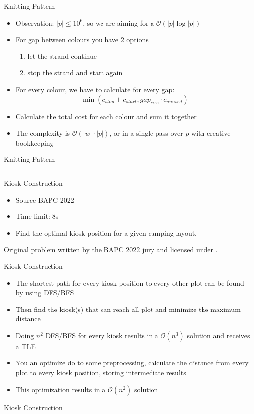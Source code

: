 \documentclass[11pt,pdf, aspectratio=169]{beamer}
\begin{document}
  \begin{frame}{Knitting Pattern}
    \begin{itemize}
      \item Observation: $|p| \leq 10^6$, so we are aiming for a $\mathcal{O}(|p|\log{}|p|)$
      \item For gap between colours you have 2 options
      \begin{enumerate}
        \item let the strand continue
        \item stop the strand and start again
      \end{enumerate}
      \item For every colour, we have to calculate for every gap: \[\min(c_{stop}+c_{start}, gap_{size}\cdot c_{unused})\]
      \item Calculate the total cost for each colour and sum it together
      \item The complexity is $\mathcal{O}(|w|\cdot |p|)$, or in a single pass over $p$ with creative bookkeeping
    \end{itemize}
  \end{frame}
  \begin{frame}[containsverbatim]{Knitting Pattern}
    \inputminted{python}{code/session-1/python/dapc-k.py}
  \end{frame}

  \begin{frame}{Kiosk Construction}
    \begin{itemize}
      \item Source BAPC 2022
      \item Time limit: 8s
      \item Find the optimal kiosk position for a given camping layout.
    \end{itemize}
    Original problem written by the BAPC 2022 jury and licensed under \doclicenseLongNameRef.

    \doclicenseImage
  \end{frame}
  \begin{frame}{Kiosk Construction}
    \begin{itemize}
      \item The shortest path for every kiosk position to every other plot can be found by using DFS/BFS
      \item Then find the kiosk(s) that can reach all plot and minimize the maximum distance
      \item Doing $n^2$ DFS/BFS for every kiosk results in a $\mathcal{O}(n^3)$ solution and receives a TLE
      \item You an optimize do to some preprocessing, calculate the distance from every plot to every kiosk position, storing intermediate results
      \item This optimization results in a $\mathcal{O}(n^2)$ solution
    \end{itemize}
  \end{frame}
  \begin{frame}[containsverbatim]{Kiosk Construction}
    \inputminted[fontsize=\tiny]{python}{code/session-1/python/bapc-k.py}
  \end{frame}
\end{document}
